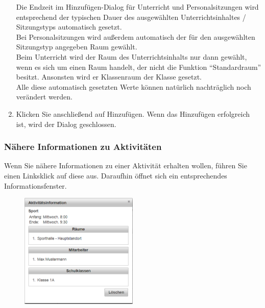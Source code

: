 \documentclass[fontsize=12pt]{scrartcl}
\begin{document}
\begin{enumerate}
    Die Endzeit im Hinzufügen-Dialog für Unterricht und Personalsitzungen wird entsprechend der typischen Dauer des ausgewählten Unterrichtsinhaltes / Sitzungstyps automatisch gesetzt. \\
    Bei Personalsitzungen wird außerdem automatisch der für den ausgewählten Sitzungstyp angegeben Raum gewählt. \\
    Beim Unterricht wird der Raum des Unterrichtsinhalts nur dann gewählt, wenn es sich um einen Raum handelt, der nicht die Funktion "`Standardraum"' besitzt. Ansonsten wird er Klassenraum der Klasse gesetzt.\\
    Alle diese automatisch gesetzten Werte können natürlich nachträglich noch verändert werden.
\item Klicken Sie anschließend auf Hinzufügen. Wenn das Hinzufügen erfolgreich ist, wird der Dialog geschlossen.
\end{enumerate}

\subsubsection{Nähere Informationen zu Aktivitäten}

Wenn Sie nähere Informationen zu einer Aktivität erhalten wollen, führen Sie einen Linksklick auf diese aus. Daraufhin öffnet sich ein entsprechendes Informationsfenster.

\begin{figure}[H]
\centering
\includegraphics[width=0.5\textwidth]{images/activityInfo.png}
\end{figure}
\end{document}
